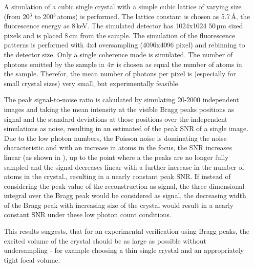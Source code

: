 A simulation of a cubic single crystal with a simple cubic lattice of varying size (from 20$^3$ to 200$^3$\,atoms) is performed. The lattice constant is chosen as 5.7\,\AA, the fluorescence energy as 8\,keV. The simulated detector has 1024x1024 50\,µm sized pixels and is placed 8\,cm from the  sample. 
The simulation of the fluorescence patterns is performed with 4x4 oversampling (4096x4096 pixel) and rebinning to the detector size. Only a single coherence mode is simulated. The number of photons emitted by the sample in 4$\pi$ is chosen as equal the number of atoms in the sample. Therefor, the mean number of photons per pixel is (especially for small crystal sizes) very small, but experimentally feasible.

The peak signal-to-noise ratio is calculated by simulating 20-2000 independent images  and taking the mean intensity at the visible Bragg peaks positions as signal and the standard deviations at those positions over the independent simulations as noise, resulting in an estimated of the peak SNR of a single image.
Due to the low photon numbers, the Poisson noise is dominating the noise characteristic and with an increase in atoms in the focus, the SNR increases linear (as shown in ), up to the point where a the peaks are no longer fully sampled and the signal decreases linear with a further increase in the number of atoms in the crystal., resulting in a nearly constant peak SNR.
If instead of considering the peak value of the reconstruction as signal, the three dimensional integral over the Bragg peak would be considered as signal, the decreasing width of the Bragg peak with increasing size of the crystal would result in a nearly constant SNR under these low photon count conditions. 

This results suggests, that for an experimental verification using Bragg peaks, the excited volume of the crystal should be as large as possible without undersampling - for example choosing a thin single crystal and an appropriately tight focal volume.

